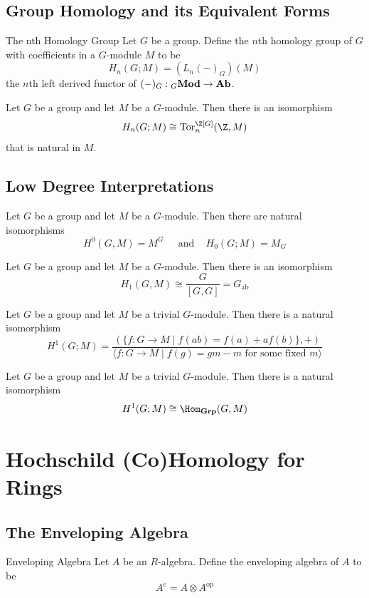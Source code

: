 \documentclass[a4paper]{article}
\begin{document}
\subsection{Group Homology and its Equivalent Forms}
\begin{defn}{The nth Homology Group}{} Let $G$ be a group. Define the $n$th homology group of $G$ with coefficients in a $G$-module $M$ to be $$H_n(G;M)=(L_n(-)_G)(M)$$ the $n$th left derived functor of $(-)_G:{_G\bold{Mod}}\to\bold{Ab}$. 
\end{defn}

\begin{thm}{}{} Let $G$ be a group and let $M$ be a $G$-module. Then there is an isomorphism $$H_n(G;M)\cong\text{Tor}_n^{\Z[G]}(\Z,M)$$ that is natural in $M$. 
\end{thm}

\subsection{Low Degree Interpretations}
\begin{thm}{}{} Let $G$ be a group and let $M$ be a $G$-module. Then there are natural isomorphisms $$H^0(G,M)=M^G\;\;\;\;\text{ and }\;\;\;H_0(G;M)=M_G$$
\end{thm}

\begin{thm}{}{} Let $G$ be a group and let $M$ be a $G$-module. Then there is an isomorphism $$H_1(G,M)\cong\frac{G}{[G,G]}=G_\text{ab}$$
\end{thm}

\begin{thm}{}{} Let $G$ be a group and let $M$ be a trivial $G$-module. Then there is a natural isomorphism $$H^1(G;M)=\frac{(\{f:G\to M\;|\;f(ab)=f(a)+af(b)\},+)}{\langle f:G\to M\;|\;f(g)=gm-m\text{ for some fixed }m\rangle}$$
\end{thm}

\begin{crl}{}{} Let $G$ be a group and let $M$ be a trivial $G$-module. Then there is a natural isomorphism $$H^1(G;M)\cong\Hom_\bold{Grp}(G,M)$$
\end{crl}
\pagebreak


\pagebreak
\section{Hochschild (Co)Homology for Rings}
\subsection{The Enveloping Algebra}
\begin{defn}{Enveloping Algebra}{} Let $A$ be an $R$-algebra. Define the enveloping algebra of $A$ to be $$A^e=A\otimes A^\text{op}$$
\end{defn}
\end{document}
